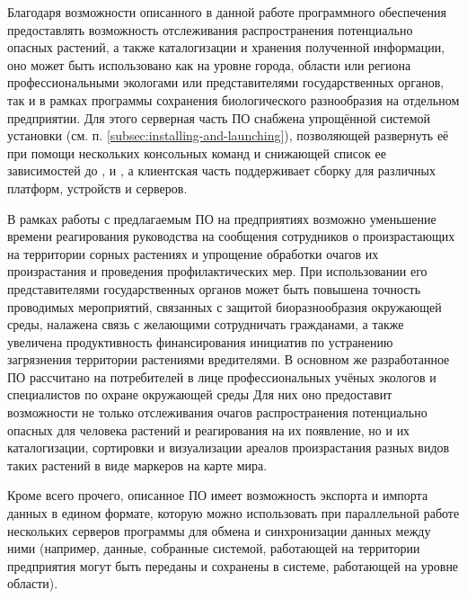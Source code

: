 \tab
Благодаря возможности описанного в данной работе программного обеспечения предоставлять возможность отслеживания распространения потенциально опасных растений, а также каталогизации и хранения полученной информации, оно может быть использовано как на уровне города, области или региона профессиональными экологами или представителями государственных органов, так и в рамках программы сохранения биологического разнообразия на отдельном предприятии.
Для этого серверная часть ПО снабжена упрощённой системой установки (см. п. \ref{subsec:installing-and-launching}), позволяющей развернуть её при помощи нескольких консольных команд и снижающей список ее зависимостей до ,  и , а клиентская часть поддерживает сборку для различных платформ, устройств и серверов.

\tab
В рамках работы с предлагаемым ПО на предприятиях возможно уменьшение времени реагирования руководства на сообщения сотрудников о произрастающих на территории сорных растениях и упрощение обработки очагов их произрастания и проведения профилактических мер.
При использовании его представителями государственных органов может быть повышена точность проводимых мероприятий, связанных с защитой биоразнообразия окружающей среды, налажена связь с желающими сотрудничать гражданами, а также увеличена продуктивность финансирования инициатив по устранению загрязнения территории растениями вредителями.
В основном же разработанное ПО рассчитано на потребителей в лице профессиональных учёных экологов и специалистов по охране окружающей среды
Для них оно предоставит возможности не только отслеживания очагов распространения потенциально опасных для человека растений и реагирования на их появление, но и их каталогизации, сортировки и визуализации ареалов произрастания разных видов таких растений в виде маркеров на карте мира.

\tab
Кроме всего прочего, описанное ПО имеет возможность экспорта и импорта данных в едином формате, которую можно использовать при параллельной работе нескольких серверов программы для обмена и синхронизации данных между ними (например, данные, собранные системой, работающей на территории предприятия могут быть переданы и сохранены в системе, работающей на уровне области).
